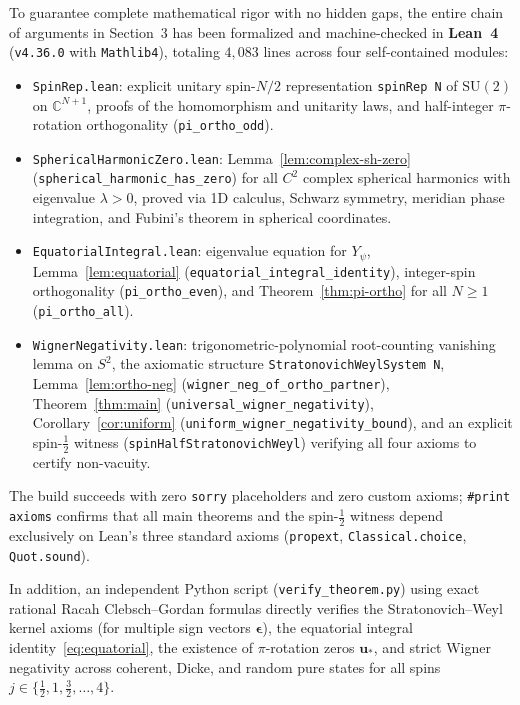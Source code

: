 \documentclass[11pt,a4paper]{article}
\theoremstyle{remark}
\newcommand{\bu}{\mathbf{u}}
\begin{document}
To guarantee complete mathematical rigor with no hidden gaps, the entire chain of arguments in Section~3 has been formalized and machine-checked in \textbf{Lean~4} (\texttt{v4.36.0} with \texttt{Mathlib4}), totaling $4{,}083$ lines across four self-contained modules:
\begin{itemize}\raggedright
\item {\small\texttt{SpinRep.lean}}: explicit unitary spin-$N/2$ representation {\small\texttt{spinRep N}} of $\mathrm{SU}(2)$ on $\mathbb{C}^{N+1}$, proofs of the homomorphism and unitarity laws, and half-integer $\pi$-rotation orthogonality ({\small\texttt{pi\_ortho\_odd}}).
\item {\small\texttt{SphericalHarmonicZero.lean}}: Lemma~\ref{lem:complex-sh-zero} ({\small\texttt{spherical\_harmonic\_has\_zero}}) for all $C^2$ complex spherical harmonics with eigenvalue $\lambda > 0$, proved via 1D calculus, Schwarz symmetry, meridian phase integration, and Fubini's theorem in spherical coordinates.
\item {\small\texttt{EquatorialIntegral.lean}}: eigenvalue equation for $Y_\psi$, Lemma~\ref{lem:equatorial} ({\small\texttt{equatorial\_integral\_identity}}), integer-spin orthogonality ({\small\texttt{pi\_ortho\_even}}), and Theorem~\ref{thm:pi-ortho} for all $N \ge 1$ ({\small\texttt{pi\_ortho\_all}}).
\item {\small\texttt{WignerNegativity.lean}}: trigonometric-polynomial root-counting vanishing lemma on $S^2$, the axiomatic structure {\small\texttt{StratonovichWeylSystem N}}, Lemma~\ref{lem:ortho-neg} ({\small\texttt{wigner\_neg\_of\_ortho\_partner}}), Theorem~\ref{thm:main} ({\small\texttt{universal\_wigner\_negativity}}), Corollary~\ref{cor:uniform} ({\small\texttt{uniform\_wigner\_negativity\_bound}}), and an explicit spin-$\frac{1}{2}$ witness ({\small\texttt{spinHalfStratonovichWeyl}}) verifying all four axioms to certify non-vacuity.
\end{itemize}
The build succeeds with zero {\small\texttt{sorry}} placeholders and zero custom axioms; {\small\texttt{\#print axioms}} confirms that all main theorems and the spin-$\frac{1}{2}$ witness depend exclusively on Lean's three standard axioms ({\small\texttt{propext}}, {\small\texttt{Classical.choice}}, {\small\texttt{Quot.sound}}).

In addition, an independent Python script ({\small\texttt{verify\_theorem.py}}) using exact rational Racah Clebsch--Gordan formulas directly verifies the Stratonovich--Weyl kernel axioms (for multiple sign vectors $\boldsymbol{\epsilon}$), the equatorial integral identity~\eqref{eq:equatorial}, the existence of $\pi$-rotation zeros $\bu_*$, and strict Wigner negativity across coherent, Dicke, and random pure states for all spins $j \in \{\frac{1}{2}, 1, \frac{3}{2}, \dots, 4\}$.
\end{document}
